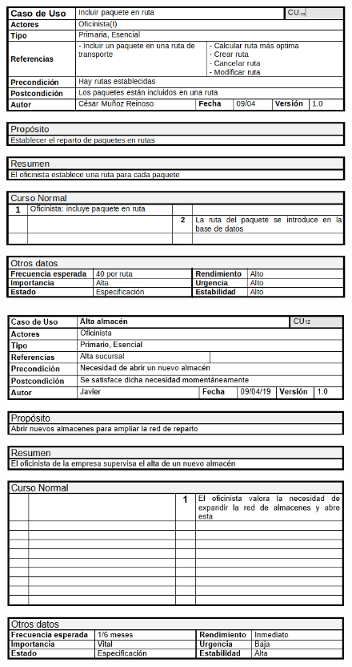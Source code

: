 \begin{figure}[H]
	\centering
	\includegraphics[width=16cm]{11}
\end{figure}
\begin{figure}[H]
	\centering
	\includegraphics[width=16cm]{12}
\end{figure}
